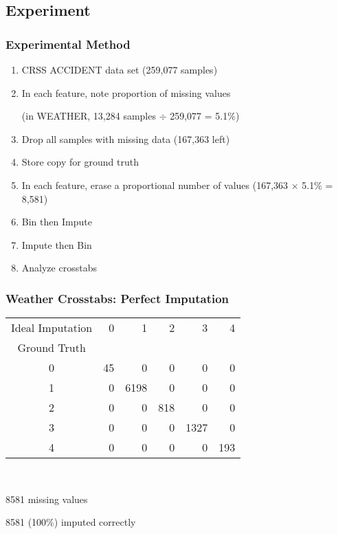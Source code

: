 \subsection{Experiment}
\begin{frame}[t]
	\frametitle{Experimental Method}
	\Large
	
	\begin{enumerate}
		\item CRSS ACCIDENT data set (259,077 samples)
		\item In each feature, note proportion of missing values 
		
		(in WEATHER, 13,284 samples $\div$ 259,077 =  5.1\%)
		\item Drop all samples with missing data (167,363 left)
		\item Store copy for ground truth
		\item In each feature, erase a proportional number of values (167,363 $\times$ 5.1\% = 8,581)
		\item Bin then Impute
		\item Impute then Bin
		\item Analyze crosstabs
		
	\end{enumerate}
\end{frame}


\begin{frame}[t]
	\frametitle{Weather Crosstabs:  Perfect Imputation}
	\Large

\begin{tabular}{crrrrr}
Ideal Imputation &   0 &     1 &    2 &     3 &    4 \\
Ground Truth &     &       &      &       &      \\
\hline
0              &  45 &     0 &    0 &     0 &    0 \\
1              &   0 &  6198 &    0 &     0 &    0 \\
2              &   0 &     0 &  818 &     0 &    0 \\
3              &   0 &     0 &    0 &  1327 &    0 \\
4              &   0 &     0 &    0 &     0 &  193 \\\end{tabular}

\

8581 missing values

8581 (100\%) imputed correctly

\end{frame}

